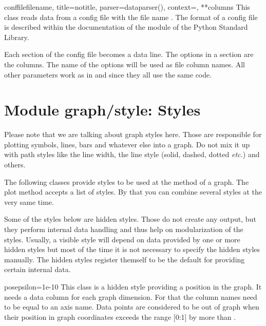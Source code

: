 \begin{classdesc}{conffile}{filename, title=notitle, parser=dataparser(), %
                            context={}, **columns}
  This class reads data from a config file with the file name
  . The format of a config file is described within the
  documentation of the  module of the Python
  Standard Library.

  Each section of the config file becomes a data line. The options in
  a section are the columns. The name of the options will be used as
  file column names. All other parameters work as in
   and  since they all use
  the same code.
\end{classdesc} %

\section{Module graph/style: Styles} %
\label{graph:style}


Please note that we are talking about graph styles here. Those are
responsible for plotting symbols, lines, bars and whatever else into a
graph. Do not mix it up with path styles like the line width, the line
style (solid, dashed, dotted \emph{etc.}) and others.

The following classes provide styles to be used at the 
method of a graph. The plot method accepts a list of styles. By that
you can combine several styles at the very same time.

Some of the styles below are hidden styles. Those do not create any
output, but they perform internal data handling and thus help on
modularization of the styles. Usually, a visible style will depend on
data provided by one or more hidden styles but most of the time it is
not necessary to specify the hidden styles manually. The hidden styles
register themself to be the default for providing certain internal
data.

\begin{classdesc}{pos}{epsilon=1e-10} %
  This class is a hidden style providing a position in the graph. It
  needs a data column for each graph dimension. For that the column
  names need to be equal to an axis name. Data points are considered
  to be out of graph when their position in graph coordinates exceeds
  the range [0:1] by more than .
\end{classdesc} %

